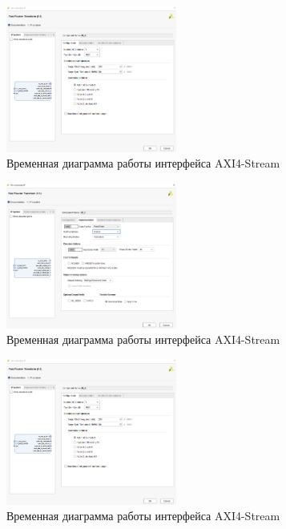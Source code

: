 \begin{figure}[h]
	\centering
	\includegraphics[width=0.5\textwidth]{image/fft_config.png}
	\caption{Временная диаграмма работы интерфейса AXI4-Stream}
	\label{fft_config}
\end{figure}
	
\begin{figure}[h]
	\centering
	\includegraphics[width=0.5\textwidth]{image/fft_implemetation.png}
	\caption{Временная диаграмма работы интерфейса AXI4-Stream}
	\label{fft_implemetation}
\end{figure}
	
\begin{figure}[h]
	\centering
	\includegraphics[width=0.5\textwidth]{image/fft_config.png}
	\caption{Временная диаграмма работы интерфейса AXI4-Stream}
	\label{fft_detailed_implem}
\end{figure}
	
